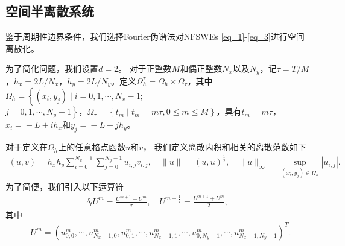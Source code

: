 \subsection{空间半离散系统}

鉴于周期性边界条件，我们选择Fourier伪谱法对NFSWEs \eqref{eq_1}-\eqref{eq_3}进行空间离散化。

为了简化问题，我们设置$d=2$。
对于正整数$M$和偶正整数$N_{x}$以及$N_{y}$，记$\tau={T}/{M}$，$h_{x}={2 L}/{N_{x}}$，$h_{y}={2 L}/{N_{y}}$。定义$\Omega_{h}^{\tau}=\Omega_{h} \times \Omega_{\tau}$，其中$\Omega_{h}=\left\{\left(x_{i}, y_{j}\right) \mid i=0,1, \cdots, N_{x}\!-\!1;\right.$\\$\left.j=0,1, \cdots, N_{y}\!-\!1\right\}$，$\Omega_{\tau}=\left\{t_{m} \mid t_{m}=m \tau, 0 \leq m \leq M\right\}$，具有$t_{m}=m \tau$，$x_{i}\!=\!-L+i h_{x}$和$y_{j}\!=\!-L+j h_{y}$。

对于定义在$\Omega_h$上的任意格点函数$u$和$v$，
我们定义离散内积和相关的离散范数如下
\begin{align}\label{eq_48}
(u, v)=h_{x} h_{y} \sum_{i=0}^{N_{x}-1} \sum_{j=0}^{N_{y}-1} u_{i, j} v_{i, j}, \quad\|u\|=(u, u)^{\frac{1}{2}}, \quad\|u\|_{\infty}=\sup _{\left(x_{i}, y_{j}\right) \in \Omega_{h}}\left|u_{i, j}\right|.
\end{align}
为了简便，我们引入以下运算符
\begin{align}\label{eq_49}
\delta_{t} U^{m}=\frac{U^{m+1}-U^{m}}{\tau}, \quad U^{m+\frac{1}{2}}=\frac{U^{m+1}+U^{m}}{2},
\end{align}
其中
\begin{align}\label{eq_47}
&U^m=\left(u_{0,0}^m, \cdots, u_{N_{x}-1,0}^m, u_{0,1}^m, \cdots, u_{N_{x}-1,1}^m, \cdots, u_{0, N_{y}-1}^m, \cdots, u_{N_{x}-1, N_{y}-1}^m\right)^{T}. %
\end{align}

